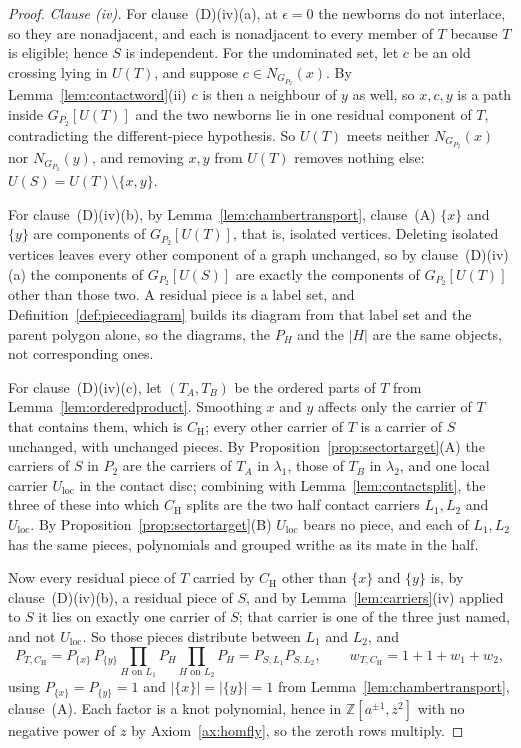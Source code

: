 \begin{proof}
\emph{Clause (iv).}
For clause~(D)(iv)(a), at $\epsilon=0$ the newborns do not interlace, so they are nonadjacent, and
each is nonadjacent to every member of $T$ because $T$ is eligible; hence $S$ is
independent. For the undominated set, let $c$ be an old crossing lying in
$U(T)$, and suppose $c\in N_{G_{P_2}}(x)$. By Lemma~\ref{lem:contactword}(ii) $c$ is
then a neighbour of $y$ as well, so $x,c,y$ is a path inside $G_{P_2}[U(T)]$
and the two newborns lie in one residual component of $T$, contradicting the
different-piece hypothesis. So $U(T)$ meets neither $N_{G_{P_2}}(x)$ nor $N_{G_{P_2}}(y)$, and
removing $x,y$ from $U(T)$ removes nothing else:
$U(S)=U(T)\setminus\{x,y\}$.

For clause~(D)(iv)(b), by Lemma~\ref{lem:chambertransport}, clause~(A) $\{x\}$ and $\{y\}$ are components of
$G_{P_2}[U(T)]$, that is, isolated vertices. Deleting isolated vertices leaves
every other component of a graph unchanged, so by clause~(D)(iv)(a) the components of
$G_{P_2}[U(S)]$ are exactly the components of $G_{P_2}[U(T)]$ other than those
two. A residual piece is a label set, and
Definition~\ref{def:piecediagram} builds its diagram from that label set and the
parent polygon alone, so the diagrams, the $P_H$ and the $|H|$ are the same
objects, not corresponding ones.

For clause~(D)(iv)(c), let $(T_A,T_B)$ be the ordered parts of $T$ from
Lemma~\ref{lem:orderedproduct}. Smoothing $x$ and $y$ affects only the carrier
of $T$ that contains them,
which is $C_{\mathrm H}$; every other carrier of $T$ is a carrier of $S$
unchanged, with unchanged pieces. By Proposition~\ref{prop:sectortarget}(A) the carriers of
$S$ in $P_2$ are the carriers of $T_A$ in $\lambda_1$, those of $T_B$ in
$\lambda_2$, and one local carrier $U_{\mathrm{loc}}$ in the contact disc; combining with
Lemma~\ref{lem:contactsplit}, the three of these into which $C_{\mathrm H}$
splits are the two half contact carriers $L_1,L_2$ and $U_{\mathrm{loc}}$. By
Proposition~\ref{prop:sectortarget}(B) $U_{\mathrm{loc}}$ bears no piece, and each of $L_1,L_2$ has
the same pieces, polynomials and grouped writhe as its mate in the half.

Now every residual piece of $T$ carried by $C_{\mathrm H}$ other than $\{x\}$
and $\{y\}$ is, by clause~(D)(iv)(b), a residual piece of $S$, and by
Lemma~\ref{lem:carriers}(iv) applied to $S$ it lies on exactly one carrier of
$S$; that carrier is one of the three just named, and not $U_{\mathrm{loc}}$. So those pieces
distribute between $L_1$ and $L_2$, and
\[
   P_{T,C_{\mathrm H}}
   =P_{\{x\}}\,P_{\{y\}}\prod_{H\text{ on }L_1}P_H\prod_{H\text{ on }L_2}P_H
   =P_{S,L_1}P_{S,L_2},
   \qquad
   w_{T,C_{\mathrm H}}=1+1+w_1+w_2,
\]
using $P_{\{x\}}=P_{\{y\}}=1$ and $|\{x\}|=|\{y\}|=1$ from
Lemma~\ref{lem:chambertransport}, clause~(A). Each factor is a knot polynomial, hence in
$\mathbb Z[a^{\pm1},z^2]$ with no negative power of $z$ by
Axiom~\ref{ax:homfly}, so the zeroth rows multiply.


\end{proof}
